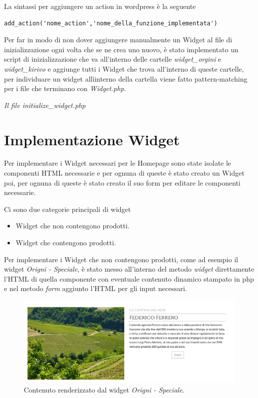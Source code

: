 La sintassi per aggiungere un action in wordpress è la seguente
\begin{verbatim}
add_action('nome_action','nome_della_funzione_implementata')
\end{verbatim}

Per far in modo di non dover aggiungere manualmente un Widget al file di inizializzazione ogni volta che se ne crea uno nuovo, è
stato implementato un script di inizializzazione che va all'interno delle cartelle \emph{widget\_orgini} e \emph{widget\_kirivo} e aggiunge tutti
i Widget che trova all'interno di queste cartelle, per individuare un widget allìinterno della cartella viene fatto pattern-matching per i file che terminano con \emph{Widget.php}.


\emph{Il file initialize\_widget.php}

\section{Implementazione Widget}
Per implementare i Widget necessari per le Homepage sono state isolate le componenti HTML necessarie e per ognuna
di queste è stato creato un Widget poi, per ognuna di queste è stato creato il suo form per editare le componenti necessarie.

Ci sono due categorie principali di widget
\begin{itemize}
\item Widget che non contengono prodotti.
\item Widget che contengono prodotti.
\end{itemize}

Per implementare i Widget che non contengono prodotti, come ad esempio il widget \emph{Origni - Speciale}, è stato messo all'interno del metodo \emph{widget} direttamente
l'HTML di quella componente con eventuale contenuto dinamico stampato in php e nel metodo \emph{form} aggiunto l'HTML per gli input necessari.

\begin{figure}
  \includegraphics[width=\textwidth]{figure/ospec.png}
  \caption{Contenuto renderizzato dal widget \emph{Origni - Speciale}.}
  \label{fig:ospec1}
\end{figure}

